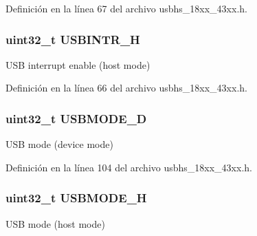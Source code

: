 Definición en la línea 67 del archivo usbhs\+\_\+18xx\+\_\+43xx.\+h.

\subsubsection[{\texorpdfstring{U\+S\+B\+I\+N\+T\+R\+\_\+H}{USBINTR_H}}]{ uint32\+\_\+t U\+S\+B\+I\+N\+T\+R\+\_\+H}\hypertarget{struct_l_p_c___u_s_b_h_s___t_a67b4a2c7b9dd79a4671688c69a348949}{}\label{struct_l_p_c___u_s_b_h_s___t_a67b4a2c7b9dd79a4671688c69a348949}
U\+SB interrupt enable (host mode) 

Definición en la línea 66 del archivo usbhs\+\_\+18xx\+\_\+43xx.\+h.

\subsubsection[{\texorpdfstring{U\+S\+B\+M\+O\+D\+E\+\_\+D}{USBMODE_D}}]{ uint32\+\_\+t U\+S\+B\+M\+O\+D\+E\+\_\+D}\hypertarget{struct_l_p_c___u_s_b_h_s___t_a47f4e360b36ece77b5379d738fde7f12}{}\label{struct_l_p_c___u_s_b_h_s___t_a47f4e360b36ece77b5379d738fde7f12}
U\+SB mode (device mode) 

Definición en la línea 104 del archivo usbhs\+\_\+18xx\+\_\+43xx.\+h.

\subsubsection[{\texorpdfstring{U\+S\+B\+M\+O\+D\+E\+\_\+H}{USBMODE_H}}]{ uint32\+\_\+t U\+S\+B\+M\+O\+D\+E\+\_\+H}\hypertarget{struct_l_p_c___u_s_b_h_s___t_a70a3a542fad485210b58ba013ff46212}{}\label{struct_l_p_c___u_s_b_h_s___t_a70a3a542fad485210b58ba013ff46212}
U\+SB mode (host mode) 

